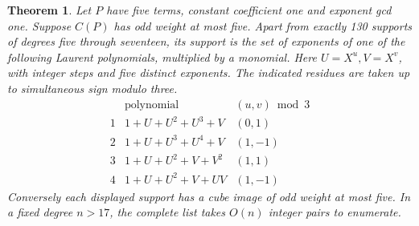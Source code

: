 \documentclass[11pt]{article}
\newtheorem{theorem}{Theorem}
\begin{document}
\begin{theorem}\label{thm:cubed-supports}
Let \(P\) have five terms, constant coefficient one and exponent gcd one.
Suppose \(C(P)\) has odd weight at most five. Apart from exactly 130
supports of degrees five through seventeen, its support is the set of
exponents of one of the following Laurent polynomials, multiplied by a
monomial. Here \(U=X^u,V=X^v\), with integer steps and five distinct
exponents. The indicated residues are taken up to simultaneous sign
modulo three.
\[
\begin{array}{c|l|c}
 &\text{polynomial}&(u,v)\bmod 3\\\hline
1&1+U+U^2+U^3+V&(0,1)\\
2&1+U+U^3+U^4+V&(1,-1)\\
3&1+U+U^2+V+V^2&(1,1)\\
4&1+U+U^2+V+UV&(1,-1)
\end{array}
\]
Conversely each displayed support has a cube image of odd weight at most
five. In a fixed degree \(n>17\), the complete list takes \(O(n)\)
integer pairs to enumerate.
\end{theorem}
\end{document}
